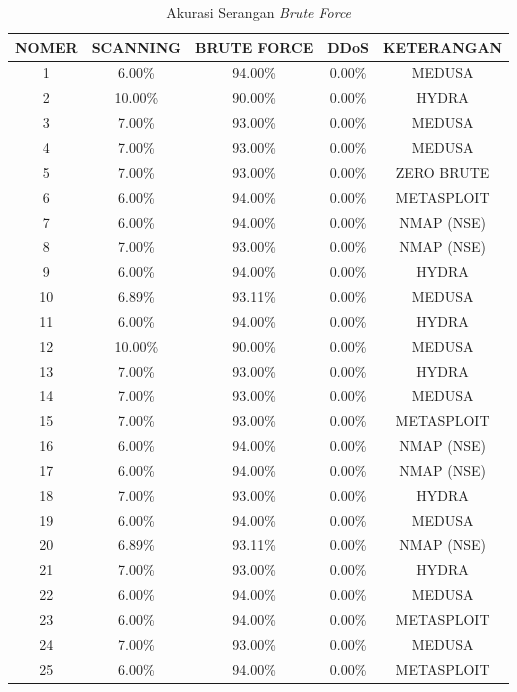 \begin{table}[H]
	\centering
	\caption{Akurasi Serangan \emph{Brute Force}}
	\label{Akurasi Serangan Brute Force}
	\begin{tabular}{|c|c|c|c|c|}
		\hline
		NOMER        & SCANNING & BRUTE FORCE & DDoS   & KETERANGAN \\ \hline
		1         & 6.00\%   & 94.00\%     & 0.00\% & MEDUSA     \\ \hline
		2         & 10.00\%  & 90.00\%     & 0.00\% & HYDRA      \\ \hline
		3         & 7.00\%   & 93.00\%     & 0.00\% & MEDUSA     \\ \hline
		4         & 7.00\%   & 93.00\%     & 0.00\% & MEDUSA     \\ \hline
		5         & 7.00\%   & 93.00\%     & 0.00\% & ZERO BRUTE \\ \hline
		6         & 6.00\%   & 94.00\%     & 0.00\% & METASPLOIT \\ \hline
		7         & 6.00\%   & 94.00\%     & 0.00\% & NMAP (NSE) \\ \hline
		8         & 7.00\%   & 93.00\%     & 0.00\% & NMAP (NSE) \\ \hline
		9         & 6.00\%   & 94.00\%     & 0.00\% & HYDRA      \\ \hline
		10        & 6.89\%   & 93.11\%     & 0.00\% & MEDUSA     \\ \hline
		11        & 6.00\%   & 94.00\%     & 0.00\% & HYDRA      \\ \hline
		12        & 10.00\%  & 90.00\%     & 0.00\% & MEDUSA     \\ \hline
		13        & 7.00\%   & 93.00\%     & 0.00\% & HYDRA      \\ \hline
		14        & 7.00\%   & 93.00\%     & 0.00\% & MEDUSA     \\ \hline
		15        & 7.00\%   & 93.00\%     & 0.00\% & METASPLOIT \\ \hline
		16        & 6.00\%   & 94.00\%     & 0.00\% & NMAP (NSE) \\ \hline
		17        & 6.00\%   & 94.00\%     & 0.00\% & NMAP (NSE) \\ \hline
		18        & 7.00\%   & 93.00\%     & 0.00\% & HYDRA      \\ \hline
		19        & 6.00\%   & 94.00\%     & 0.00\% & MEDUSA     \\ \hline
		20        & 6.89\%   & 93.11\%     & 0.00\% & NMAP (NSE) \\ \hline
		21        & 7.00\%   & 93.00\%     & 0.00\% & HYDRA      \\ \hline
		22        & 6.00\%   & 94.00\%     & 0.00\% & MEDUSA     \\ \hline
		23        & 6.00\%   & 94.00\%     & 0.00\% & METASPLOIT \\ \hline
		24        & 7.00\%   & 93.00\%     & 0.00\% & MEDUSA     \\ \hline
		25        & 6.00\%   & 94.00\%     & 0.00\% & METASPLOIT \\ \hline
		
			\end{tabular}
	\end{table}

